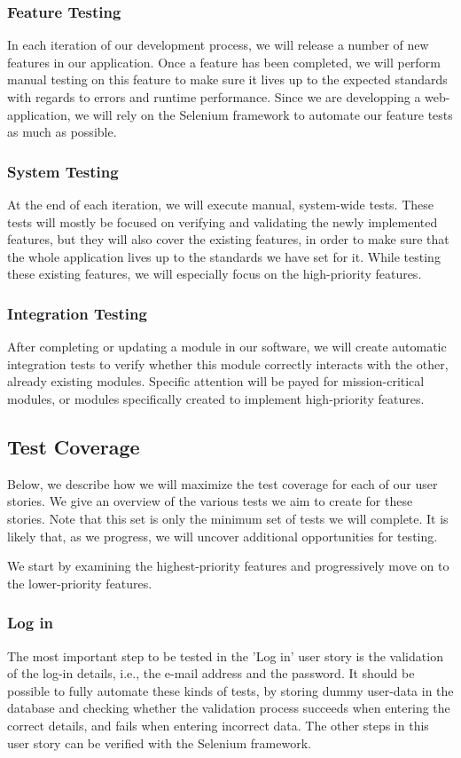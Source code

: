 \documentclass[10pt,a4paper,BCOR12mm, headexclude, footexclude,
  twoside, openright]{scrartcl}
\numberwithin{equation}{section} %
\numberwithin{figure}{section} %
\numberwithin{table}{section} %
\begin{document}
\subsubsection*{Feature Testing}
In each iteration of our development process, we will release a number of new
features in our application. Once a feature has been completed, we will perform
manual testing on this feature to make sure it lives up to the expected
standards with regards to errors and runtime performance.
Since we are developping a web-application, we will rely on the Selenium
framework to automate our feature tests as
much as possible.

\subsubsection*{System Testing}
At the end of each iteration, we will execute manual, system-wide tests. These
tests will mostly be focused on verifying and validating the newly implemented
features, but they will also cover the existing features, in order to make sure
that the whole application lives up to the standards we have set for it.  While
testing these existing features, we will especially focus on the high-priority
features.

\subsubsection*{Integration Testing}
After completing or updating a module in our software, we will create automatic
integration tests to verify whether this module correctly interacts with the
other, already existing modules. Specific attention will be payed for
mission-critical modules, or modules specifically created to implement
high-priority features.

\subsection{Test Coverage}
Below, we describe how we will maximize the test coverage for each of our user
stories. We give an overview of the various tests we aim to create for these
stories.  Note that this set is only the minimum set of tests we will
complete. It is likely that, as we progress, we will uncover additional
opportunities for testing.

We start by examining the highest-priority features and progressively move on to
the lower-priority features.

\subsubsection*{Log in}
The most important step to be tested in the 'Log in' user story is the
validation of the log-in details, i.e., the e-mail address and the password.  It
should be possible to fully automate these kinds of tests, by storing dummy
user-data in the database and checking whether the validation process succeeds
when entering the correct details, and fails when entering incorrect data.  The
other steps in this user story can be verified with the Selenium framework.
\end{document}
